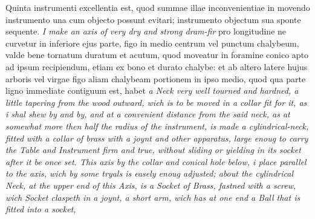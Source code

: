 \pstart Quinta instrumenti excellentia est, quod summae illae inconvenientiae in movendo instrumento una cum objecto possunt evitari; instrumento objectum sua sponte sequente. \textit{I make an axis of very dry and strong dram-fir}  pro longitudine ne curvetur in inferiore ejus parte, figo in medio  centrum vel punctum chalybeum, valde bene tornatum duratum et acutum, quod moveatur in foramine conico apto ad ipsum recipiendum, etiam ex bono et durato chalybe: et ab altero latere hujus arboris vel virgae figo aliam chalybeam portionem in ipso medio, quod qua parte ligno immediate contiguum est, habet \textit{a Neck very well tourned and hardned, a little tapering from the wood outward, wich is to be moved in a collar fit for it, as i shal shew by and by, and at a convenient distance from the said neck, as at somewhat more then half the radius of the instrument, is made a cylindrical-neck, fitted with a collar of brass with a joynt and other apparatus, large enoug to carry the Table and Instrument firm and true, without sliding or yielding in its socket after it be once set. This axis by the collar and conical hole below, i place parallel to the axis, wich by some tryals is easely enoug adjusted; about the cylindrical Neck, at the upper end of this Axis, is a Socket of Brass, fastned with a screw, wich Socket claspeth in a joynt, a short arm, wich has at one end a Ball that is fitted into a socket,}
